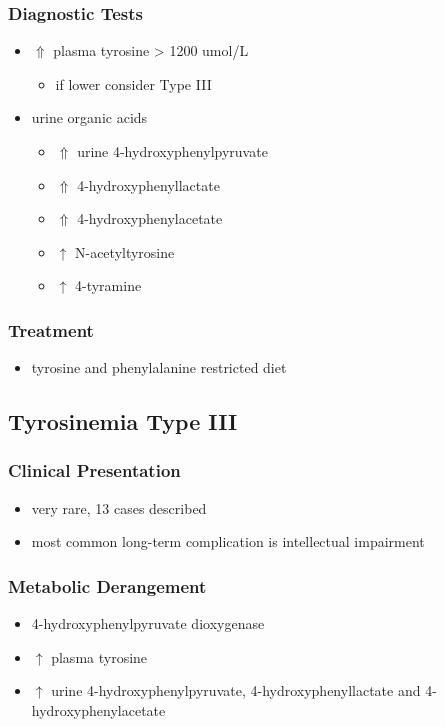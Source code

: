 \documentclass{scrartcl}
\begin{document}
\subsubsection{Diagnostic Tests}
\label{sec:org1f984be}
\begin{itemize}
\item \(\Uparrow\) plasma tyrosine > 1200 umol/L
\begin{itemize}
\item if lower consider Type III
\end{itemize}
\item urine organic acids
\begin{itemize}
\item \(\Uparrow\) urine 4-hydroxyphenylpyruvate
\item \(\Uparrow\) 4-hydroxyphenyllactate
\item \(\Uparrow\) 4-hydroxyphenylacetate
\item \(\uparrow\) N-acetyltyrosine
\item \(\uparrow\) 4-tyramine
\end{itemize}
\end{itemize}

\subsubsection{Treatment}
\label{sec:org22d6eb3}
\begin{itemize}
\item tyrosine and phenylalanine restricted diet
\end{itemize}

\subsection{Tyrosinemia Type III}
\label{sec:org382fc2b}
\subsubsection{Clinical Presentation}
\label{sec:org4271dd2}
\begin{itemize}
\item very rare, 13 cases described
\item most common long-term complication is intellectual impairment
\end{itemize}
\subsubsection{Metabolic Derangement}
\label{sec:org8865022}
\begin{itemize}
\item 4-hydroxyphenylpyruvate dioxygenase
\end{itemize}
\begin{itemize}
\item \(\uparrow\) plasma tyrosine
\item \(\uparrow\) urine 4-hydroxyphenylpyruvate, 4-hydroxyphenyllactate and 4-hydroxyphenylacetate
\end{itemize}
\end{document}
